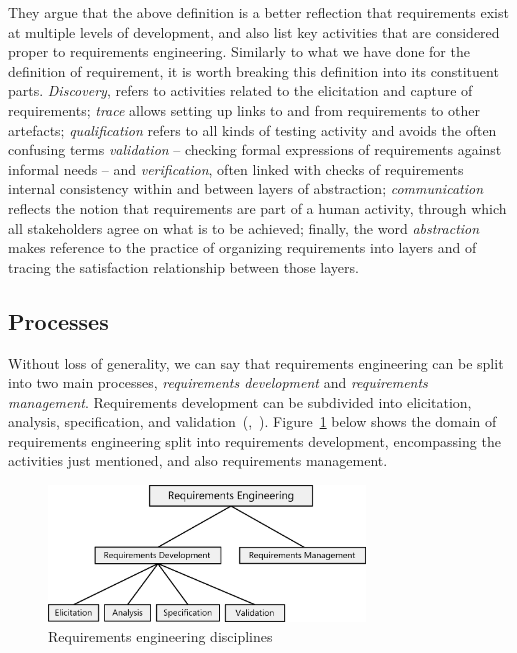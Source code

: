 \documentclass[dissertation,final]{softeng}
\begin{document}
They argue that the above definition is a better reflection that requirements exist at multiple levels of development, and also list key activities that are considered proper to requirements engineering. Similarly to what we have done for the definition of requirement, it is worth breaking this definition into its constituent parts. \emph{Discovery}, refers to activities related to the elicitation and capture of requirements; \emph{trace} allows setting up links to and from requirements to other artefacts; \emph{qualification} refers to all kinds of testing activity and avoids the often confusing terms \emph{validation} -- checking formal expressions of requirements against informal needs -- and \emph{verification}, often linked with checks of requirements internal consistency within and between layers of abstraction; \emph{communication} reflects the notion that requirements are part of a human activity, through which all stakeholders agree on what is to be achieved; finally, the word \emph{abstraction} makes reference to the practice of organizing requirements into layers and of tracing the satisfaction relationship between those layers.

\subsection{Processes}
Without loss of generality, we can say that requirements engineering can be split into two main processes, \emph{requirements development} and \emph{requirements management}. Requirements development can be subdivided into elicitation, analysis, specification, and validation~(,~\citeyear{SWEBOK}). Figure~\ref{fig:requirements_engineering_disciplines} below shows the domain of requirements engineering split into requirements development, encompassing the activities just mentioned, and also requirements management.

\begin{figure}[h]
\includegraphics[width=0.75\textwidth]{RequirementsEngineeringDisciplines}
\centering
\caption[Requirements engineering disciplines]{Requirements engineering disciplines~\citep[p. 15]{Wiegers2013}}
\label{fig:requirements_engineering_disciplines}
\end{figure}
\end{document}
